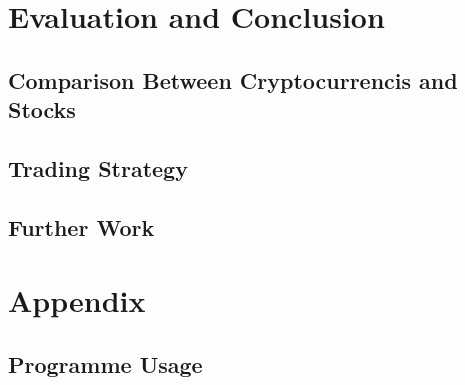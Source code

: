 \documentclass[11pt]{article} %
\theoremstyle{plain}
\theoremstyle{definition}
\begin{document}
\section{Evaluation and Conclusion}
\subsection{Comparison Between Cryptocurrencis and Stocks}
\subsection{Trading Strategy}
\subsection{Further Work}

\section{Appendix}
\subsection{Programme Usage}



\end{document}
